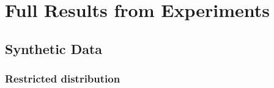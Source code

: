 \documentclass[10pt]{scrartcl}
\theoremstyle{plain}
\theoremstyle{definition}
\begin{document}
\section{Full Results from Experiments}





\subsection{Synthetic Data}
\label{app:synthetic-results}



\subsubsection{Restricted distribution}
\vspace{-15pt}
\end{document}
